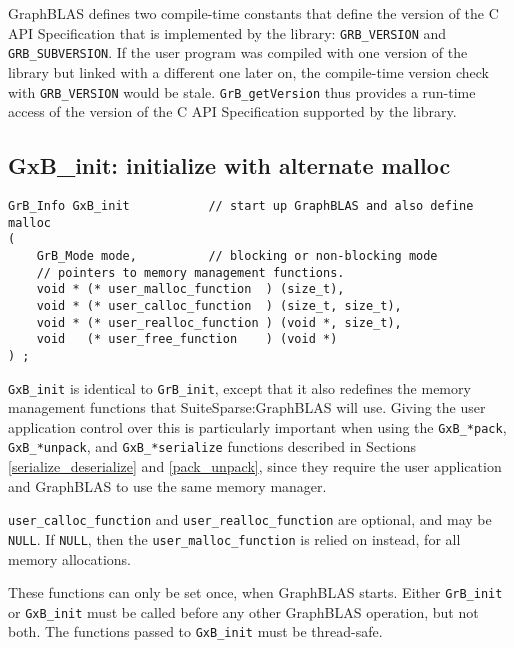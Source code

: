 \documentclass[12pt]{article}
\begin{document}
GraphBLAS defines two compile-time constants that
define the version of the C API Specification
that is implemented by the library:
\verb'GRB_VERSION' and \verb'GRB_SUBVERSION'.
If the user program was compiled with one
version of the library but linked with a different one later on, the
compile-time version check with \verb'GRB_VERSION' would be stale.
\verb'GrB_getVersion' thus provides a run-time access of the version of the C
API Specification supported by the library.

\newpage
\subsection{{\sf GxB\_init:} initialize with alternate malloc} %
\label{xinit}

\begin{mdframed}[userdefinedwidth=6in]
{\footnotesize
\begin{verbatim}
GrB_Info GxB_init           // start up GraphBLAS and also define malloc
(
    GrB_Mode mode,          // blocking or non-blocking mode
    // pointers to memory management functions.
    void * (* user_malloc_function  ) (size_t),
    void * (* user_calloc_function  ) (size_t, size_t),
    void * (* user_realloc_function ) (void *, size_t),
    void   (* user_free_function    ) (void *)
) ;
\end{verbatim}
}\end{mdframed}

\verb'GxB_init' is identical to \verb'GrB_init', except that it also redefines
the memory management functions that SuiteSparse:GraphBLAS will use.  Giving
the user application control over this is particularly important when using the
\verb'GxB_*pack',
\verb'GxB_*unpack', and \verb'GxB_*serialize' functions described in
Sections \ref{serialize_deserialize} and \ref{pack_unpack},
since they require the user application and
GraphBLAS to use the same memory manager.

\verb'user_calloc_function' and \verb'user_realloc_function' are optional, and
may be \verb'NULL'.  If \verb'NULL', then the \verb'user_malloc_function' is
relied on instead, for all memory allocations.

These functions can only be set once, when GraphBLAS starts.   Either
\verb'GrB_init' or \verb'GxB_init' must be called before any other GraphBLAS
operation, but not both.  The functions passed to \verb'GxB_init' must be
thread-safe.
\end{document}

